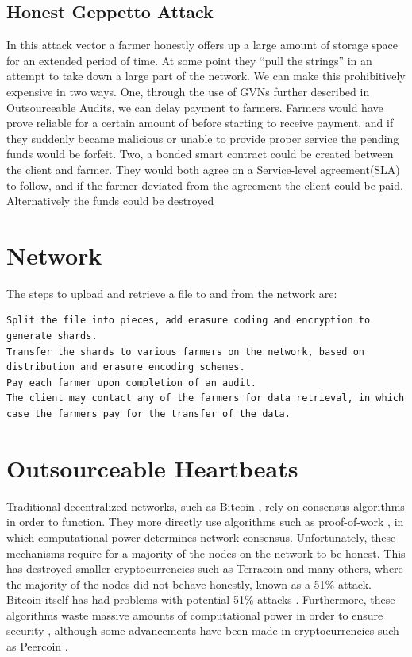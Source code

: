 \documentclass[a4paper,10pt]{article}
\begin{document}
\subsection{Honest Geppetto Attack}
In this attack vector a farmer honestly offers up a large amount of storage space for an extended period of time. At some point they “pull the strings” in an attempt to take down a large part of the network. We can make this prohibitively expensive in two ways. One, through the use of GVNs further described in Outsourceable Audits, we can delay payment to farmers. Farmers would have prove reliable for a certain amount of before starting to receive payment, and if they suddenly became malicious or unable to provide proper service the pending funds would be forfeit. Two, a bonded smart contract could be created between the client and farmer. They would both agree on a Service-level agreement(SLA) to follow, and if the farmer deviated from the agreement the client could be paid. Alternatively the funds could be destroyed

\section{Network}
The steps to upload and retrieve a file to and from the network are:
\begin{lstlisting}
Split the file into pieces, add erasure coding and encryption to generate shards.
Transfer the shards to various farmers on the network, based on distribution and erasure encoding schemes.
Pay each farmer upon completion of an audit.
The client may contact any of the farmers for data retrieval, in which case the farmers pay for the transfer of the data.
\end{lstlisting}

\section{Outsourceable Heartbeats}
Traditional decentralized networks, such as Bitcoin \cite{3}, rely on consensus algorithms in order to function. They more directly use algorithms such as proof-of-work \cite{3}, in which computational power determines network consensus. Unfortunately, these mechanisms require for a majority of the nodes on the network to be honest. This has destroyed smaller cryptocurrencies such as Terracoin \cite{17} and many others, where the majority of the nodes did not behave honestly, known as a 51\% attack. Bitcoin itself has had problems with potential 51\% attacks \cite{18}. Furthermore, these algorithms waste massive amounts of computational power in order to ensure security \cite{19}, although some advancements have been made in cryptocurrencies such as Peercoin \cite{19}.  \\
\end{document}
